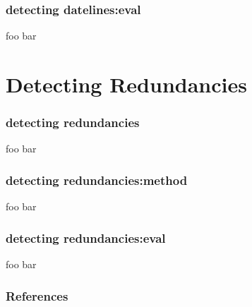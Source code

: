 \documentclass[table]{beamer}
\begin{document}
\begin{frame}
datelines:method}
  foo bar
\end{frame}

\begin{frame}
  \frametitle{detecting datelines:eval}
  foo bar
\end{frame}

\section{Detecting Redundancies}
\begin{frame}
  \frametitle{detecting redundancies}
  foo bar
\end{frame}

\begin{frame}
  \frametitle{detecting redundancies:method}
  foo bar
\end{frame}

\begin{frame}
  \frametitle{detecting redundancies:eval}
  foo bar
\end{frame}

\begin{frame}
  \frametitle{References}
  
  
\end{frame}
\end{document}
